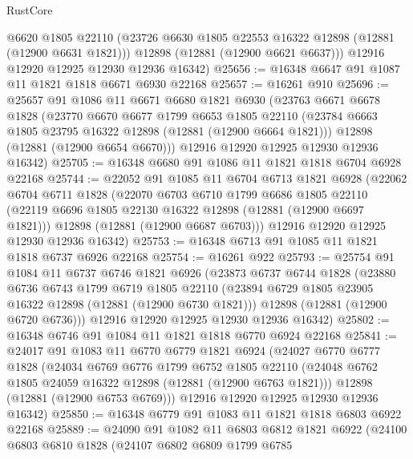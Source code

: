\begin{lexlean}{RustCore}
\begin{coremodule}
        @6620
        @1805
        @22110
        (@23726 @6630 @1805 @22553 @16322 @12898 (@12881 (@12900 @6631 @1821)))
        @12898
        (@12881 (@12900 @6621 @6637)))
      @12916
      @12920
      @12925
      @12930
      @12936
      @16342)
@25656 := @16348 @6647 @91 @1087 @11 @1821 @1818 @6671 @6930 @22168
@25657 := @16261 @910
@25696 := @25657
    @91
    @1086
    @11
    @6671
    @6680
    @1821
    @6930
    (@23763
      @6671
      @6678
      @1828
      (@23770
        @6670
        @6677
        @1799
        @6653
        @1805
        @22110
        (@23784 @6663 @1805 @23795 @16322 @12898 (@12881 (@12900 @6664 @1821)))
        @12898
        (@12881 (@12900 @6654 @6670)))
      @12916
      @12920
      @12925
      @12930
      @12936
      @16342)
@25705 := @16348 @6680 @91 @1086 @11 @1821 @1818 @6704 @6928 @22168
@25744 := @22052
    @91
    @1085
    @11
    @6704
    @6713
    @1821
    @6928
    (@22062
      @6704
      @6711
      @1828
      (@22070
        @6703
        @6710
        @1799
        @6686
        @1805
        @22110
        (@22119 @6696 @1805 @22130 @16322 @12898 (@12881 (@12900 @6697 @1821)))
        @12898
        (@12881 (@12900 @6687 @6703)))
      @12916
      @12920
      @12925
      @12930
      @12936
      @16342)
@25753 := @16348 @6713 @91 @1085 @11 @1821 @1818 @6737 @6926 @22168
@25754 := @16261 @922
@25793 := @25754
    @91
    @1084
    @11
    @6737
    @6746
    @1821
    @6926
    (@23873
      @6737
      @6744
      @1828
      (@23880
        @6736
        @6743
        @1799
        @6719
        @1805
        @22110
        (@23894 @6729 @1805 @23905 @16322 @12898 (@12881 (@12900 @6730 @1821)))
        @12898
        (@12881 (@12900 @6720 @6736)))
      @12916
      @12920
      @12925
      @12930
      @12936
      @16342)
@25802 := @16348 @6746 @91 @1084 @11 @1821 @1818 @6770 @6924 @22168
@25841 := @24017
    @91
    @1083
    @11
    @6770
    @6779
    @1821
    @6924
    (@24027
      @6770
      @6777
      @1828
      (@24034
        @6769
        @6776
        @1799
        @6752
        @1805
        @22110
        (@24048 @6762 @1805 @24059 @16322 @12898 (@12881 (@12900 @6763 @1821)))
        @12898
        (@12881 (@12900 @6753 @6769)))
      @12916
      @12920
      @12925
      @12930
      @12936
      @16342)
@25850 := @16348 @6779 @91 @1083 @11 @1821 @1818 @6803 @6922 @22168
@25889 := @24090
    @91
    @1082
    @11
    @6803
    @6812
    @1821
    @6922
    (@24100
      @6803
      @6810
      @1828
      (@24107
        @6802
        @6809
        @1799
        @6785

\end{coremodule}
\end{lexlean}
